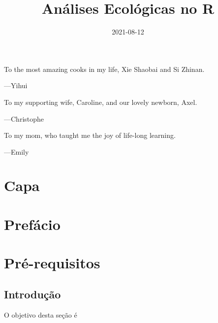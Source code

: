 \documentclass[
]{book}
\title{Análises Ecológicas no R}
\author{}
\date{\vspace{-2.5em}2021-08-12}
\begin{document}
\maketitle

\cleardoublepage\newpage\thispagestyle{empty}\null
\cleardoublepage\newpage\thispagestyle{empty}\null
\thispagestyle{empty}
\begin{large}
To the most amazing cooks in my life, Xie Shaobai and Si Zhinan.
\begin{flushright}
---Yihui
\end{flushright}

\bigskip

To my supporting wife, Caroline, and our lovely newborn, Axel.
\begin{flushright}
---Christophe
\end{flushright}

\bigskip

To my mom, who taught me the joy of life-long learning.
\begin{flushright}
---Emily
\end{flushright}
\end{large}

\setlength{\abovedisplayskip}{-5pt}
\setlength{\abovedisplayshortskip}{-5pt}

{
\setcounter{tocdepth}{2}
\tableofcontents
}
\hypertarget{capa}{%
\chapter*{Capa}\label{capa}}


\newpage

\hypertarget{prefuxe1cio}{%
\chapter*{Prefácio}\label{prefuxe1cio}}


\newpage

\hypertarget{base-r}{%
\chapter{Pré-requisitos}\label{base-r}}

\hypertarget{introduuxe7uxe3o}{%
\section{Introdução}\label{introduuxe7uxe3o}}

O objetivo desta seção é
\end{document}
